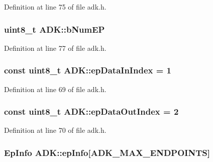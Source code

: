 \-Definition at line 75 of file adk.\-h.

\hypertarget{class_a_d_k_adf969d306da15baecd5c59bbb568053e}{
\subsubsection[{b\-Num\-E\-P}]{\setlength{\rightskip}{0pt plus 5cm}uint8\-\_\-t {\bf \-A\-D\-K\-::b\-Num\-E\-P}}}\label{class_a_d_k_adf969d306da15baecd5c59bbb568053e}


\-Definition at line 77 of file adk.\-h.

\hypertarget{class_a_d_k_a964ec80ac133bf8d65cf0274e37b29da}{
\subsubsection[{ep\-Data\-In\-Index}]{\setlength{\rightskip}{0pt plus 5cm}const uint8\-\_\-t {\bf \-A\-D\-K\-::ep\-Data\-In\-Index} = 1}}\label{class_a_d_k_a964ec80ac133bf8d65cf0274e37b29da}


\-Definition at line 69 of file adk.\-h.

\hypertarget{class_a_d_k_acfc5a7e45f15bba7ff8cd42552796624}{
\subsubsection[{ep\-Data\-Out\-Index}]{\setlength{\rightskip}{0pt plus 5cm}const uint8\-\_\-t {\bf \-A\-D\-K\-::ep\-Data\-Out\-Index} = 2}}\label{class_a_d_k_acfc5a7e45f15bba7ff8cd42552796624}


\-Definition at line 70 of file adk.\-h.

\hypertarget{class_a_d_k_a6ffc693d731ddeb9499c11e893fc467d}{
\subsubsection[{ep\-Info}]{\setlength{\rightskip}{0pt plus 5cm}\-Ep\-Info {\bf \-A\-D\-K\-::ep\-Info}\mbox{[}{\bf \-A\-D\-K\-\_\-\-M\-A\-X\-\_\-\-E\-N\-D\-P\-O\-I\-N\-T\-S}\mbox{]}}}\label{class_a_d_k_a6ffc693d731ddeb9499c11e893fc467d}


